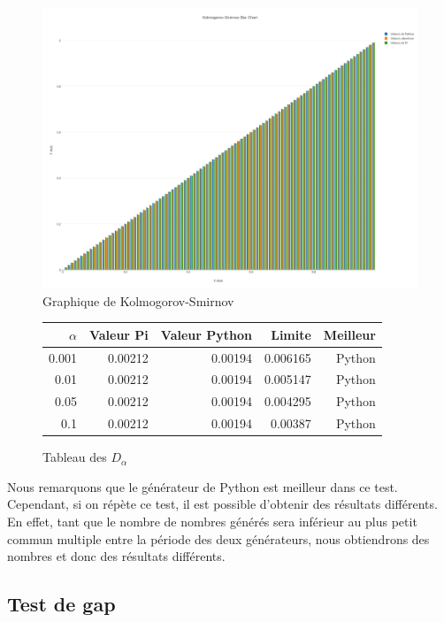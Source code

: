 \documentclass[10pt,a4paper]{article}
\begin{document}
	\begin{figure}[h]
		\centering
		\includegraphics[scale=0.25]{../chart_images/kolmogorov-smirnov_bar_chart.png}
		\caption{Graphique de Kolmogorov-Smirnov}
	\end{figure}
	
	\begin{figure}[h]
		\centering
		\begin{tabular}{|r|r|r|r|r|}
			\hline
			$\alpha$ & Valeur Pi & Valeur Python & Limite & Meilleur\\
			\hline
			0.001 & 0.00212 & 0.00194 & 0.006165 & Python\\
			0.01 & 0.00212 & 0.00194 & 0.005147 & Python\\
			0.05 & 0.00212 & 0.00194 & 0.004295 & Python\\
			0.1 & 0.00212 & 0.00194 & 0.00387 & Python\\
			\hline
		\end{tabular}
		\caption{Tableau des $D_\alpha$}
	\end{figure}
	
	\newpage
	Nous remarquons que le générateur de Python est meilleur dans ce test.
	Cependant, si on répète ce test, il est possible d'obtenir des résultats différents.
	En effet, tant que le nombre de nombres générés sera inférieur au plus petit commun multiple entre la période des deux générateurs, nous obtiendrons des nombres et donc des résultats différents.
	
	
\newpage
\subsection{Test de gap}
	
\end{document}
